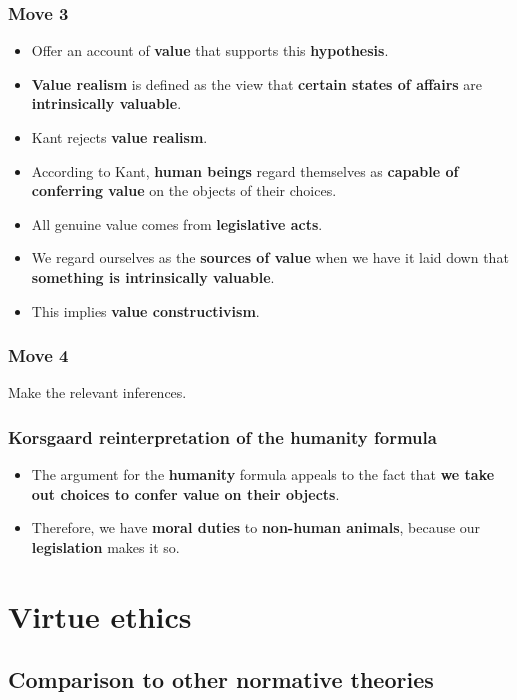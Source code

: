 \documentclass[11pt]{article}
\begin{document}
 \newpage
\subsubsection{Move 3}
\label{sec:org815bccb}
\begin{itemize}
\item Offer an account of \textbf{value} that supports this \textbf{hypothesis}.
\item \textbf{Value realism} is defined as the view that \textbf{certain states of affairs} are \textbf{intrinsically valuable}.
\item Kant rejects \textbf{value realism}.
\item According to Kant, \textbf{human beings} regard themselves as \textbf{capable of conferring value} on the objects of their choices.
\item All genuine value comes from \textbf{legislative acts}.
\item We regard ourselves as the \textbf{sources of value} when we have it laid down that \textbf{something is intrinsically valuable}.
\item This implies \textbf{value constructivism}.
\end{itemize}
\subsubsection{Move 4}
\label{sec:orge35daff}
Make the relevant inferences.
\subsubsection{Korsgaard reinterpretation of the humanity formula}
\label{sec:org9d72ca8}
\begin{itemize}
\item The argument for the \textbf{humanity} formula appeals to the fact that \textbf{we take out choices to confer value on their objects}.
\item Therefore, we have \textbf{moral duties} to \textbf{non-human animals}, because our \textbf{legislation} makes it so.
\end{itemize}

 \newpage
\section{Virtue ethics}
\label{sec:orgf3536fe}

\subsection{Comparison to other normative theories}
\label{sec:org83effd7}
\end{document}
